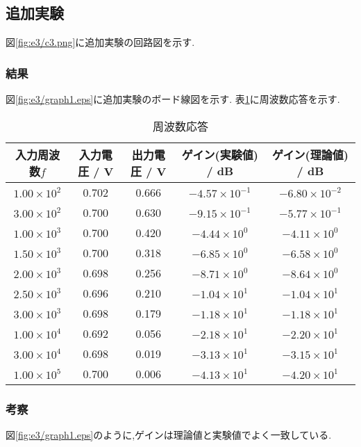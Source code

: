\subsection{追加実験}
図\ref{fig:e3/c3.png}に追加実験の回路図を示す.
\subsubsection{結果}
図\ref{fig:e3/graph1.eps}に追加実験のボード線図を示す.
表\ref{tab:e3_outou}に周波数応答を示す.
\begin{table}[h]
  \caption{周波数応答}
  \label{tab:e3_outou}
  \centering
  \begin{tabular}{ccccc}
    \hline
    入力周波数$f$&入力電圧 / \si{\volt}&出力電圧 / \si{\volt}&ゲイン(実験値) / \si{\deci\bel}&ゲイン(理論値) / \si{\deci\bel}\\
    \hline \hline
    $1.00\times10^2$ & 0.702 & 0.666 & $-4.57\times10^{-1}$ & $-6.80\times10^{-2}$ \\
    $3.00\times10^2$ & 0.700 & 0.630 & $-9.15\times10^{-1}$ & $-5.77\times10^{-1}$ \\
    $1.00\times10^3$ & 0.700 & 0.420 & $-4.44\times10^{0}$ & $-4.11\times10^{0}$ \\
    $1.50\times10^3$ & 0.700 & 0.318 & $-6.85\times10^{0}$ & $-6.58\times10^{0}$ \\
    $2.00\times10^3$ & 0.698 & 0.256 & $-8.71\times10^{0}$ & $-8.64\times10^{0}$ \\
    $2.50\times10^3$ & 0.696 & 0.210 & $-1.04\times10^{1}$ & $-1.04\times10^{1}$ \\
    $3.00\times10^3$ & 0.698 & 0.179 & $-1.18\times10^{1}$ & $-1.18\times10^{1}$ \\
    $1.00\times10^4$ & 0.692 & 0.056 & $-2.18\times10^{1}$ & $-2.20\times10^{1}$ \\
    $3.00\times10^4$ & 0.698 & 0.019 & $-3.13\times10^{1}$ & $-3.15\times10^{1}$ \\
    $1.00\times10^5$ & 0.700 & 0.006 & $-4.13\times10^{1}$ & $-4.20\times10^{1}$ \\
    \hline
  \end{tabular}
\end{table}
\subsubsection{考察}
図\ref{fig:e3/graph1.eps}のように,ゲインは理論値と実験値でよく一致している.